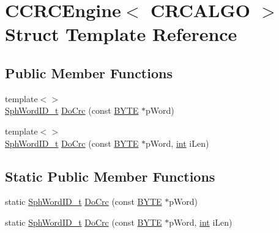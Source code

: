 \hypertarget{structCCRCEngine}{\section{C\-C\-R\-C\-Engine$<$ C\-R\-C\-A\-L\-G\-O $>$ Struct Template Reference}
\label{structCCRCEngine}
}
\subsection*{Public Member Functions}
\begin{DoxyCompactItemize}
\item 
{\footnotesize template$<$$>$ }\\\hyperlink{sphinx_8h_a80a94d5984fdf9214a98f3e5e65df963}{Sph\-Word\-I\-D\-\_\-t} \hyperlink{structCCRCEngine_a16a9a21a18618b9c4ab15d40ee45892f}{Do\-Crc} (const \hyperlink{sphinxstd_8h_a4ae1dab0fb4b072a66584546209e7d58}{B\-Y\-T\-E} $\ast$p\-Word)
\item 
{\footnotesize template$<$$>$ }\\\hyperlink{sphinx_8h_a80a94d5984fdf9214a98f3e5e65df963}{Sph\-Word\-I\-D\-\_\-t} \hyperlink{structCCRCEngine_a2bd378098769a9d87abbf51336d34abe}{Do\-Crc} (const \hyperlink{sphinxstd_8h_a4ae1dab0fb4b072a66584546209e7d58}{B\-Y\-T\-E} $\ast$p\-Word, \hyperlink{sphinxexpr_8cpp_a4a26e8f9cb8b736e0c4cbf4d16de985e}{int} i\-Len)
\end{DoxyCompactItemize}
\subsection*{Static Public Member Functions}
\begin{DoxyCompactItemize}
\item 
static \hyperlink{sphinx_8h_a80a94d5984fdf9214a98f3e5e65df963}{Sph\-Word\-I\-D\-\_\-t} \hyperlink{structCCRCEngine_ae37291c18db57058cf176ec9f720d519}{Do\-Crc} (const \hyperlink{sphinxstd_8h_a4ae1dab0fb4b072a66584546209e7d58}{B\-Y\-T\-E} $\ast$p\-Word)
\item 
static \hyperlink{sphinx_8h_a80a94d5984fdf9214a98f3e5e65df963}{Sph\-Word\-I\-D\-\_\-t} \hyperlink{structCCRCEngine_af00aee909b330f1e5faa92a6313f959f}{Do\-Crc} (const \hyperlink{sphinxstd_8h_a4ae1dab0fb4b072a66584546209e7d58}{B\-Y\-T\-E} $\ast$p\-Word, \hyperlink{sphinxexpr_8cpp_a4a26e8f9cb8b736e0c4cbf4d16de985e}{int} i\-Len)
\end{DoxyCompactItemize}


